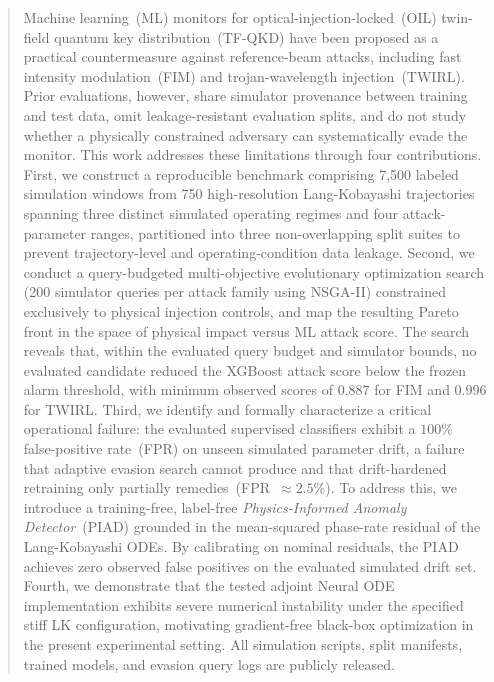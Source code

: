\documentclass[journal,twocolumn]{IEEEtran}
\begin{document}
\begin{abstract}
Machine learning~(ML) monitors for optical-injection-locked~(OIL) twin-field
quantum key distribution~(TF-QKD) have been proposed as a practical countermeasure
against reference-beam attacks, including fast intensity modulation~(FIM) and
trojan-wavelength injection~(TWIRL). Prior evaluations, however, share simulator
provenance between training and test data, omit leakage-resistant evaluation splits,
and do not study whether a physically constrained adversary can systematically evade
the monitor. This work addresses these limitations through four contributions.
First, we construct a reproducible benchmark comprising 7{,}500 labeled simulation
windows from 750 high-resolution Lang-Kobayashi trajectories spanning three distinct
simulated operating regimes and four attack-parameter ranges, partitioned into three
non-overlapping split suites to prevent trajectory-level and operating-condition
data leakage. Second, we conduct a query-budgeted multi-objective evolutionary 
optimization search (200 simulator queries per attack family using NSGA-II) constrained 
exclusively to physical injection controls, and map the resulting Pareto front in the 
space of physical impact versus ML attack score. The search reveals that, within the 
evaluated query budget and simulator bounds, no evaluated candidate reduced the XGBoost 
attack score below the frozen alarm threshold, with minimum observed scores of 0.887 
for FIM and 0.996 for TWIRL. Third, we identify and formally characterize a critical 
operational failure: the evaluated supervised classifiers exhibit a $100\%$ false-positive 
rate~(FPR) on unseen simulated parameter drift, a failure that adaptive evasion search 
cannot produce and that drift-hardened retraining only partially remedies~(FPR~$\approx 2.5\%$). 
To address this, we introduce a training-free, label-free \emph{Physics-Informed Anomaly 
Detector}~(PIAD) grounded in the mean-squared phase-rate residual of the Lang-Kobayashi ODEs. 
By calibrating on nominal residuals, the PIAD achieves zero observed false positives on the 
evaluated simulated drift set. Fourth, we demonstrate that the tested adjoint Neural ODE 
implementation exhibits severe numerical instability under the specified stiff LK configuration, 
motivating gradient-free black-box optimization in the present experimental setting. 
All simulation scripts, split manifests, trained models, and evasion query logs are publicly released.
\end{abstract}
\end{document}
